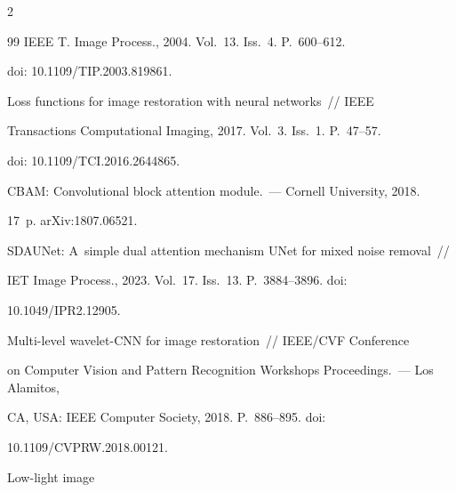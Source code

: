 \begin{multicols}{2}
{{\begin{thebibliography}{99}
    IEEE T. Image Process., 2004. Vol.~13. Iss.~4. P.~600--612. 


doi: 10.1109/TIP.2003.819861.


    






    Loss functions for image restoration with neural networks~// IEEE


    Transactions Computational Imaging, 2017. Vol.~3. Iss.~1. P.~47--57. 


doi: 10.1109/TCI.2016.2644865.


    






    CBAM: Convolutional block attention module.~--- Cornell University, 2018. 


17~p.  arXiv:1807.06521. 


    






    SDAUNet: A~simple dual attention mechanism UNet for mixed noise removal~// 


IET Image Process., 2023. Vol.~17. Iss.~13. P.~3884--3896. doi: 


10.1049/IPR2.12905.


    






    Multi-level wavelet-CNN for image restoration~// IEEE/CVF Conference 


on Computer Vision and Pattern Recognition Workshops Proceedings.~--- Los Alamitos, 


CA, USA: IEEE Computer Society, 2018. P.~886--895. doi: 


10.1109/CVPRW.2018.00121.


    




     Low-light image 



\end{thebibliography}}}
\end{multicols}
